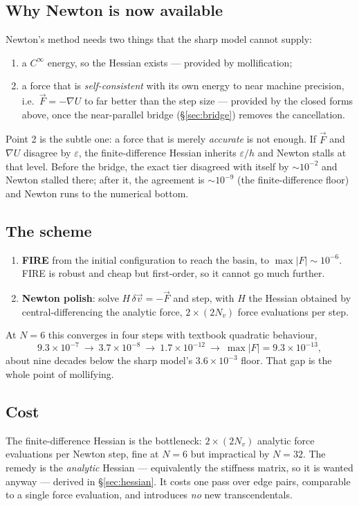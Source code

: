 \documentclass[11pt]{article}
\numberwithin{equation}{section}
\newcommand{\vv}[1]{\vec{#1}}
\newcommand{\eps}{\varepsilon}
\begin{document}
\subsection{Why Newton is now available}
Newton's method needs two things that the sharp model cannot supply:
\begin{enumerate}
\item a $C^\infty$ energy, so the Hessian exists --- provided by mollification;
\item a force that is \emph{self-consistent} with its own energy to near machine precision, i.e.\
  $\vv F=-\nabla U$ to far better than the step size --- provided by the closed forms above, once the
  near-parallel bridge (\S\ref{sec:bridge}) removes the cancellation.
\end{enumerate}
Point 2 is the subtle one: a force that is merely \emph{accurate} is not enough. If $\vv F$ and
$\nabla U$ disagree by $\eps$, the finite-difference Hessian inherits $\eps/h$ and Newton stalls at
that level. Before the bridge, the exact tier disagreed with itself by $\sim10^{-2}$ and Newton stalled
there; after it, the agreement is $\sim10^{-9}$ (the finite-difference floor) and Newton runs to the
numerical bottom.

\subsection{The scheme}
\begin{enumerate}
\item \textbf{FIRE} from the initial configuration to reach the basin, to $\max|F|\sim10^{-6}$. FIRE is
  robust and cheap but first-order, so it cannot go much further.
\item \textbf{Newton polish}: solve $H\,\delta\vv v=-\vv F$ and step, with $H$ the Hessian obtained by
  central-differencing the analytic force, $2\times(2N_v)$ force evaluations per step.
\end{enumerate}
At $N=6$ this converges in four steps with textbook quadratic behaviour,
\[
  9.3\times10^{-7}\ \longrightarrow\ 3.7\times10^{-8}\ \longrightarrow\ 1.7\times10^{-12}
  \ \longrightarrow\ \max|F|=9.3\times10^{-13},
\]
about nine decades below the sharp model's $3.6\times10^{-3}$ floor. That gap is the whole point of
mollifying.

\subsection{Cost}
The finite-difference Hessian is the bottleneck: $2\times(2N_v)$ analytic force evaluations per Newton
step, fine at $N=6$ but impractical by $N=32$. The remedy is the \emph{analytic} Hessian ---
equivalently the stiffness matrix, so it is wanted anyway --- derived in \S\ref{sec:hessian}. It costs
one pass over edge pairs, comparable to a single force evaluation, and introduces \emph{no} new
transcendentals.
\end{document}
